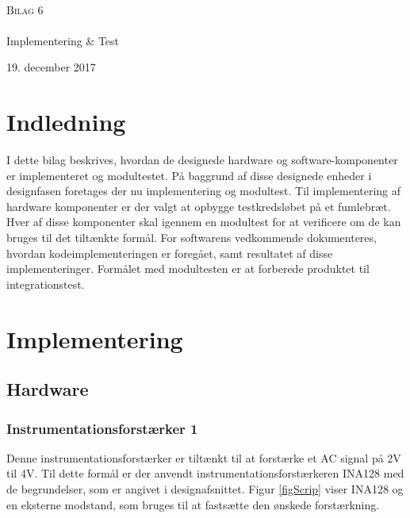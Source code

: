 

\begin{titlingpage}
\begin{center}

~ \\[3cm]


\textsc{\LARGE Bilag 6	}\\[1.5cm]


\noindent\makebox[\linewidth]{\rule{\textwidth}{0.4pt}}\\
[0.5cm]{\Huge Implementering \& Test}
\noindent\makebox[\linewidth]{\rule{\textwidth}{0.4pt}}
\end{center}
\vfill
\begin{center}
{\large 19. december 2017}
\end{center}
\end{titlingpage}

\newpage
\tableofcontents*
\newpage

\chapter{Indledning}
I dette bilag beskrives, hvordan de designede hardware og software-komponenter er implementeret og modultestet. På baggrund af disse designede enheder i designfasen foretages der nu implementering og modultest. Til implementering af hardware komponenter er der valgt at opbygge testkredsløbet på et fumlebræt. Hver af disse komponenter skal igennem en modultest for at verificere om de kan bruges til det tiltænkte formål. For softwarens vedkommende dokumenteres, hvordan kodeimplementeringen er foregået, samt resultatet af disse implementeringer. Formålet med modultesten er at forberede produktet til integrationstest.       
\chapter{Implementering}
\section{Hardware}
\subsection{Instrumentationsforstærker 1}
Denne instrumentationsforstærker er tiltænkt til at forstærke et AC signal på 2V til 4V. Til dette formål  er der anvendt instrumentationsforstærkeren INA128 med de begrundelser, som er angivet i designafsnittet. Figur \ref{figScrip} viser INA128 og en eksterne modstand, som bruges til at fastsætte den ønskede forstærkning.  


